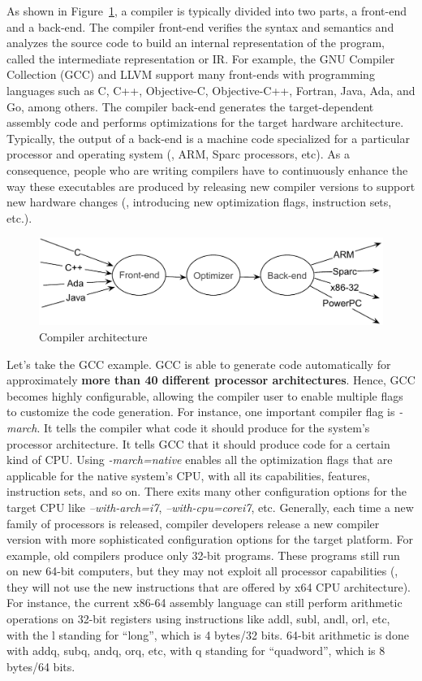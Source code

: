 As shown in Figure~\ref{fig:compilers}, a compiler is typically divided into two parts, a front-end and a back-end. The compiler front-end verifies the syntax and semantics and analyzes the source code to build an internal representation of the program, called the intermediate representation or IR. For example, the GNU Compiler Collection (GCC) and LLVM support many front-ends with programming languages such as C, C++, Objective-C, Objective-C++, Fortran, Java, Ada, and Go, among others. The compiler back-end generates the target-dependent assembly code and performs optimizations for the target hardware architecture. Typically, the output of a back-end is a machine code specialized for a particular processor and operating system (\eg, ARM, Sparc processors, etc).
As a consequence, people who are writing compilers have to continuously enhance the way these executables are produced by releasing new compiler versions to support new hardware changes (\ie, introducing new optimization flags, instruction sets, etc.). 
\begin{figure}[h]
	\center
	\includegraphics[scale=0.65]{Background/fig/compilers}
	\caption{Compiler architecture}
	\label{fig:compilers}
\end{figure}

Let's take the GCC example. GCC is able to generate code automatically for approximately \textbf{more than 40 different processor architectures}. Hence, GCC becomes highly configurable, allowing the compiler user to enable multiple flags to customize the code generation. For instance, one important compiler flag is \textit{-march}. It tells the compiler what code it should produce for the system's processor architecture. It tells GCC that it should produce code for a certain kind of CPU. Using \textit{-march=native} enables all the optimization flags that are applicable for the native system's CPU, with all its capabilities, features, instruction sets, and so on. There exits many other configuration options for the target CPU like \textit{--with-arch=i7}, \textit{--with-cpu=corei7}, etc.
Generally, each time a new family of processors is released, compiler developers release a new compiler version with more sophisticated configuration options for the target platform. For example, old compilers produce only 32-bit programs. These programs still run on new 64-bit computers, but they may not exploit all processor capabilities (\eg, they will not use the new instructions that are offered by x64 CPU architecture). For instance, the current x86-64 assembly language can still perform arithmetic operations on 32-bit registers using instructions like addl, subl, andl, orl, etc, with the l standing for ``long'', which is 4 bytes/32 bits. 64-bit arithmetic is done with addq, subq, andq, orq, etc, with q standing for ``quadword'', which is 8 bytes/64 bits.

